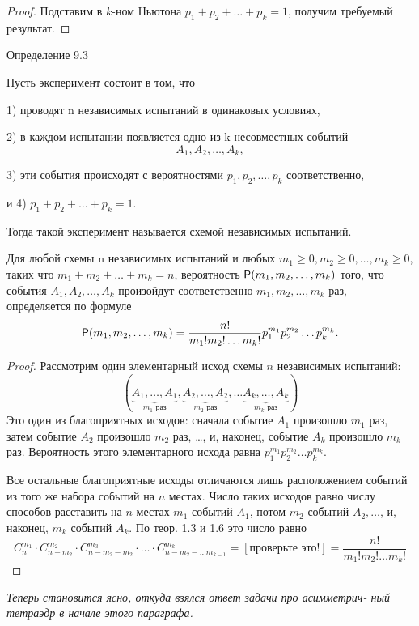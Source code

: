 \begin{proof}
	Подставим в $k$-ном Ньютона $p_1+p_2+\ldots+p_k = 1$,
получим требуемый результат.
\end{proof}

\begin{repdefinition}{Определение 9.3}
\label{def:9.3}

	Пусть эксперимент состоит в том, что

1) проводят n независимых испытаний в одинаковых условиях,

2) в каждом испытании появляется одно из k несовместных событий
{$$A_1, A_2,\ldots, A_k,$$}

3) эти события происходят с вероятностями $p_1, p_2,\ldots, p_k$ соответственно,

и 4) $p_1 + p_2 + \ldots+ p_k = 1$.

Тогда такой эксперимент называется схемой независимых испытаний.
\end{repdefinition}

\begin{theorem}
\label{th:9.5}

	Для любой схемы n независимых испытаний и любых \newline
$m_1 \geqslant 0, m_2 \geqslant 0,\ldots  , m_k \geqslant 0$, таких что $m_1 + m_2 +\ldots  + m_k = n$, вероятность $\P(m_1,m_2,\ldots  ,m_k)$ того, что события $A_1, A_2,\ldots  , A_k$ произойдут
соответственно $m_1,m_2,\ldots  ,m_k$ раз, определяется по формуле
	\begin{equation*}
		\P(m_1,m_2,\ldots,m_k)=\frac{n!}{m_1!m_2!\ldots m_k!}p_1^{m_1}p_2^{m_2}\ldots p_k^{m_k}.
	\end{equation*}
\end{theorem}

\begin{proof}
Рассмотрим один элементарный исход схемы $n$ независимых испытаний:
\begin{equation*}
	(\underbrace{A_1,\ldots , A_1}_{m_1 \text{ раз}}, 
	\underbrace{A_2, \ldots,A_2}_{m_2 \text{ раз}},
	\ldots
	\underbrace{A_k,\ldots , A_k}_{m_k \text{ раз}})
\end{equation*}
Это один из благоприятных исходов: сначала событие $A_1$ произошло $m_1$ раз,
затем событие $A_2$ произошло $m_2$ раз, \ldots, и, наконец, событие $A_k$ произошло
$m_k$ раз. Вероятность этого элементарного исхода равна 
$p^{m_1}_1p^{m_2}_2\ldots p^{m_k}_k$.

Все остальные благоприятные исходы отличаются лишь расположением
событий из того же набора событий на $n$ местах. Число таких исходов равно
числу способов расставить на $n$ местах $m_1$ событий $A_1$, потом $m_2$ событий
$A_2, \ldots$, и, наконец, $m_k$ событий $A_k$. По теор. 1.3 и 1.6 это число равно
\begin{equation*}
	C_n^{m_1}\cdot C_{n-m_2}^{m_2}\cdot C_{n-m_2-m_2}^{m_3}\cdot\ldots\cdot
	C_{n-m_2-\ldots m_{k-1}}^{m_k}=
	\left[\text{проверьте это!} \right]=\frac{n!}{m_1!m_2!\ldots m_k!}
\end{equation*}
\end{proof}
\textit{Теперь становится ясно, откуда взялся ответ задачи про асимметрич-
ный тетраэдр в начале этого параграфа.}